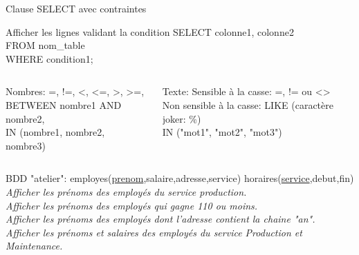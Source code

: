 \documentclass[xetex,dvipsnames]{beamer}
\begin{document}
\begin{frame}[t]{Clause SELECT avec contraintes}
\begin{alertblock}{Afficher les lignes validant la condition}
		SELECT colonne1, colonne2 \\FROM nom\_table \\WHERE condition1; %
	\end{alertblock}

\begin{footnotesize}
 \begin{columns}[t]
    \begin{column}{0.45\textwidth}
	\begin{block}{Nombres:}
		=, !=, <, <=, >, >=,
		\\BETWEEN nombre1 AND nombre2,
		\\IN (nombre1, nombre2, nombre3)
	\end{block}
	    \end{column}
	    \begin{column}{0.55\textwidth}
		\begin{block}{Texte:}
Sensible à la casse: =, != ou <> 
\\Non sensible à la casse: LIKE (caractère joker: \%)
\\IN ("mot1", "mot2", "mot3")
	\end{block}
		    \end{column}
	    \end{columns}
\end{footnotesize}

\begin{scriptsize}
\vspace{1em}
BDD "atelier": employes(\underline{prenom},salaire,adresse,service) horaires(\underline{service},debut,fin)\\
\vspace{0.5em}
		\textit{Afficher les prénoms des employés du service production.}\\
		\textit{Afficher les prénoms des employés qui gagne 110 ou moins.}\\
		\textit{Afficher les prénoms des employés dont l'adresse contient la chaine "an".}\\
		\textit{Afficher les prénoms et salaires des employés du service Production et Maintenance.}\\
\end{scriptsize}
\end{frame}
\end{document}
